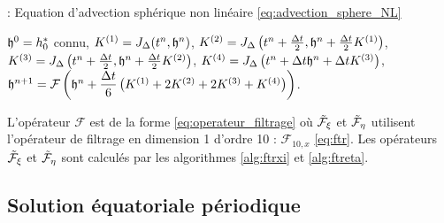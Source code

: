 \begin{center}
\begin{minipage}[H]{12cm}
  \begin{algorithm}[H]
    \caption{: Equation d'advection sphérique non linéaire \eqref{eq:advection_sphere_NL} }\label{alg:RK4_transportSa_NL}
    \begin{algorithmic}[1]
    \State $\mathfrak{h}^0 = h_0^*$ connu,
             \State  $K^{(1)} = J_{\Delta}(t^n, \mathfrak{h}^n)$,
             \State  $K^{(2)} = J_{\Delta}\left(t^n + \frac{\Delta t}{2}, \mathfrak{h}^n + \frac{\Delta t}{2} K^{(1)} \right)$,
             \State  $K^{(3)} = J_{\Delta}\left(t^n + \frac{\Delta t}{2}, \mathfrak{h}^n + \frac{\Delta t}{2} K^{(2)} \right)$,
             \State  $K^{(4)} = J_{\Delta}\left(t^n + \Delta t \mathfrak{h}^n + \Delta t K^{(3)} \right)$,  
             \State  $\mathfrak{h}^{n+1} = \mathcal{F}\left( \mathfrak{h}^n  + \dfrac{\Delta t}{6} \left( K^{(1)} + 2 K^{(2)} + 2 K^{(3)} + K^{(4)} \right) \right)$.
            \EndFor
    \end{algorithmic}
    \end{algorithm}
\end{minipage}
\end{center}

L'opérateur $\mathcal{F}$ est de la forme \eqref{eq:operateur_filtrage} où $\tilde{\mathcal{F}}_{\xi}$ et $\tilde{\mathcal{F}}_{\eta}$ utilisent l'opérateur de filtrage en dimension 1 d'ordre 10 : $\mathcal{F}_{10,x}$ \eqref{eq:ftr}. Les opérateurs $\tilde{\mathcal{F}}_{\xi}$ et $\tilde{\mathcal{F}}_{\eta}$ sont calculés par les algorithmes \ref{alg:ftrxi} et \ref{alg:ftreta}.


























\subsection{Solution équatoriale périodique}


